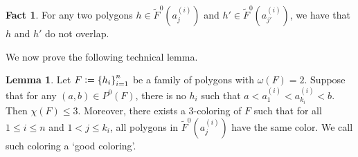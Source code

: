 \documentclass[12pt]{article}
\theoremstyle{definition}
\newtheorem{lemma}[thm]{Lemma}
\newtheorem{fact}[thm]{Fact}
\newcommand{\defeq}{\vcentcolon=}
\begin{document}
     \begin{fact}
         For any two polygons
         $h \in \widetilde{F}^{0}\left(a_{j}^{\left(i\right)}\right)$ 
         and 
         $h' \in \widetilde{F}^{0}\left(a_{j'}^{\left(i\right)}\right)$, 
         we have that $h$ and $h'$
         do not overlap.    
     \end{fact}

     We now prove the following
     technical lemma.

     \begin{lemma} \label{lemma:poly}
         Let $F \defeq \left\{h_{i}\right\}_{i =1}^{n}$ 
         be a family of polygons with
         $\omega\left(F\right) = 2$.
         Suppose that for any
         $\left(a, b\right) \in P^{0}\left(F\right)$,
         there is no $h_{i}$ such
         that $a < a_1^{\left(i\right)}
         < a_{k_{i}}^{\left(i\right)} < b$.
         Then $\chi\left(F\right) \leq 3$.
         Moreover, there exists
         a 3-coloring of $F$ such
         that for all $1 \leq i \leq n$
         and $1 < j \leq k_{i}$,
         all polygons in
         $\widetilde{F}^{0}\left(a_{j}^{\left(i\right)}\right)$
         have the same color.
         We call such coloring a
         `good coloring'.
     \end{lemma}
\end{document}
